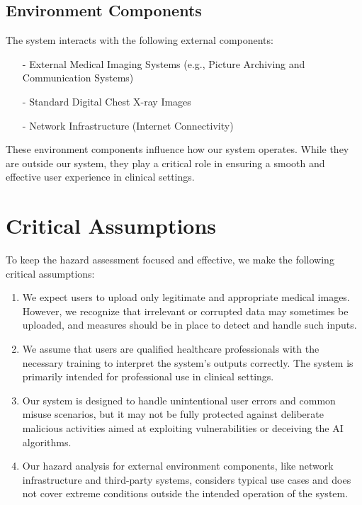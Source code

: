 \documentclass{article}
\begin{document}
\subsection{Environment Components}

The system interacts with the following external components:

\begin{itemize}
    \item[-] External Medical Imaging Systems (e.g., Picture Archiving and Communication Systems)
    \item[-] Standard Digital Chest X-ray Images
    \item[-] Network Infrastructure (Internet Connectivity)
\end{itemize}
These environment components influence how our system operates. While they are outside our system, they play a critical role in ensuring a smooth and effective user experience in clinical settings.

\section{Critical Assumptions}

To keep the hazard assessment focused and effective, we make the following critical assumptions:

\begin{enumerate}
    \item {We expect users to upload only legitimate and appropriate medical images. However, we recognize that irrelevant or corrupted data may sometimes be uploaded, and measures should be in place to detect and handle such inputs.}

    \item {We assume that users are qualified healthcare professionals with the necessary training to interpret the system's outputs correctly. The system is primarily intended for professional use in clinical settings.}
    \item {Our system is designed to handle unintentional user errors and common misuse scenarios, but it may not be fully protected against deliberate malicious activities aimed at exploiting vulnerabilities or deceiving the AI algorithms.}
    \item {Our hazard analysis for external environment components, like network infrastructure and third-party systems, considers typical use cases and does not cover extreme conditions outside the intended operation of the system.}

\end{enumerate}
\end{document}
